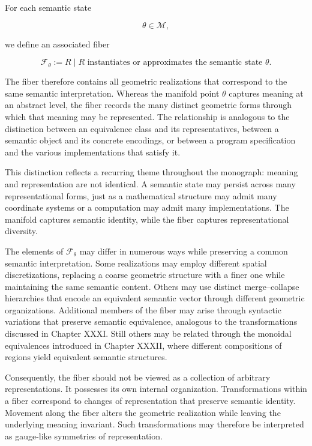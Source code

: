 \documentclass[12pt,letterpaper]{article}
\theoremstyle{remark}
\begin{document}
For each semantic state

\[
\theta \in \mathcal{M},
\]

we define an associated fiber

\[
\mathcal{F}_{\theta}
:=
{
R
\mid
R \text{ instantiates or approximates the semantic state }
\theta
}.
\]

The fiber therefore contains all geometric realizations that correspond to the same semantic interpretation. Whereas the manifold point $\theta$ captures meaning at an abstract level, the fiber records the many distinct geometric forms through which that meaning may be represented. The relationship is analogous to the distinction between an equivalence class and its representatives, between a semantic object and its concrete encodings, or between a program specification and the various implementations that satisfy it.

This distinction reflects a recurring theme throughout the monograph: meaning and representation are not identical. A semantic state may persist across many representational forms, just as a mathematical structure may admit many coordinate systems or a computation may admit many implementations. The manifold captures semantic identity, while the fiber captures representational diversity.

The elements of $\mathcal{F}_{\theta}$ may differ in numerous ways while preserving a common semantic interpretation. Some realizations may employ different spatial discretizations, replacing a coarse geometric structure with a finer one while maintaining the same semantic content. Others may use distinct merge--collapse hierarchies that encode an equivalent semantic vector through different geometric organizations. Additional members of the fiber may arise through syntactic variations that preserve semantic equivalence, analogous to the transformations discussed in Chapter XXXI. Still others may be related through the monoidal equivalences introduced in Chapter XXXII, where different compositions of regions yield equivalent semantic structures.

Consequently, the fiber should not be viewed as a collection of arbitrary representations. It possesses its own internal organization. Transformations within a fiber correspond to changes of representation that preserve semantic identity. Movement along the fiber alters the geometric realization while leaving the underlying meaning invariant. Such transformations may therefore be interpreted as gauge-like symmetries of representation.
\end{document}
